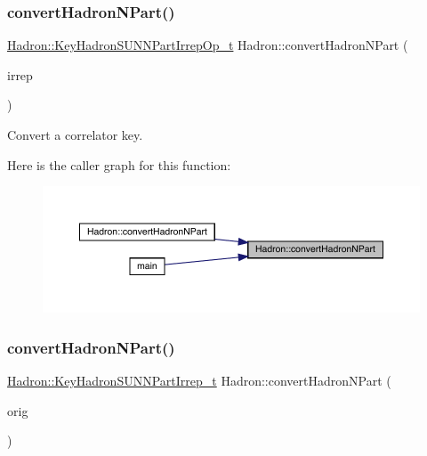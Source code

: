 \subsubsection{\texorpdfstring{convertHadronNPart()}{convertHadronNPart()}\hspace{0.1cm}{\footnotesize\ttfamily [1/3]}}
{\footnotesize\ttfamily \mbox{\hyperlink{structHadron_1_1KeyHadronSUNNPartIrrepOp__t}{Hadron\+::\+Key\+Hadron\+S\+U\+N\+N\+Part\+Irrep\+Op\+\_\+t}} Hadron\+::convert\+Hadron\+N\+Part (\begin{DoxyParamCaption}\item[{const \mbox{\hyperlink{structHadron_1_1KeyHadronNPartIrrepOp__t}{Key\+Hadron\+N\+Part\+Irrep\+Op\+\_\+t}} \&}]{irrep }\end{DoxyParamCaption})}



Convert a correlator key. 

Here is the caller graph for this function\+:
\nopagebreak
\begin{figure}[H]
\begin{center}
\leavevmode
\includegraphics[width=350pt]{d1/daf/namespaceHadron_ac6bc3e869d76d287be23c6d20cb9c104_icgraph}
\end{center}
\end{figure}
\mbox{\label{namespaceHadron_a870585feaeca280be18774aa6242e2e9}} 
\subsubsection{\texorpdfstring{convertHadronNPart()}{convertHadronNPart()}\hspace{0.1cm}{\footnotesize\ttfamily [2/3]}}
{\footnotesize\ttfamily \mbox{\hyperlink{structHadron_1_1KeyHadronSUNNPartIrrep__t}{Hadron\+::\+Key\+Hadron\+S\+U\+N\+N\+Part\+Irrep\+\_\+t}} Hadron\+::convert\+Hadron\+N\+Part (\begin{DoxyParamCaption}\item[{const \mbox{\hyperlink{structHadron_1_1KeyHadronNPartIrrep__t}{Key\+Hadron\+N\+Part\+Irrep\+\_\+t}} \&}]{orig }\end{DoxyParamCaption})}



